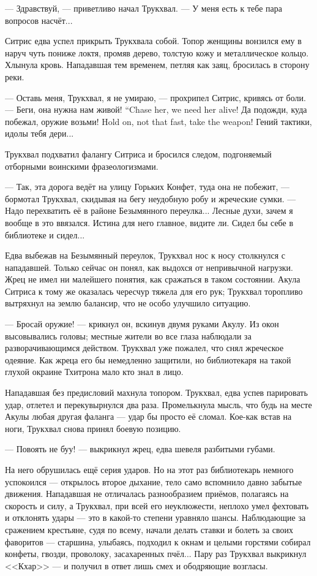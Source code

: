 --- Здравствуй, --- приветливо начал Трукхвал.
--- У меня есть к тебе пара вопросов насчёт...

Ситрис едва успел прикрыть Трукхвала собой.
Топор женщины вонзился ему в наруч чуть пониже локтя, промяв дерево, толстую кожу и металлическое кольцо.
Хлынула кровь.
Нападавшая тем временем, петляя как заяц, бросилась в сторону реки.

--- Оставь меня, Трукхвал, я не умираю, --- прохрипел Ситрис, кривясь от боли.
{--- Беги, она нужна нам живой!}
{``Chase her, we need her alive!}
{Да подожди, куда побежал, оружие возьми!}
{Hold on, not that fast, take the weapon!}
Гений тактики, идолы тебя дери...

Трукхвал подхватил фалангу Ситриса и бросился следом, подгоняемый отборными воинскими фразеологизмами.

--- Так, эта дорога ведёт на улицу Горьких Конфет, туда она не побежит, --- бормотал Трукхвал, скидывая на бегу неудобную робу и жреческие сумки.
--- Надо перехватить её в районе Безымянного переулка...
Лесные духи, зачем я вообще в это ввязался.
Истина для него главное, видите ли.
Сидел бы себе в библиотеке и сидел...

Едва выбежав на Безымянный переулок, Трукхвал нос к носу столкнулся с нападавшей.
Только сейчас он понял, как выдохся от непривычной нагрузки.
Жрец не имел ни малейшего понятия, как сражаться в таком состоянии.
Акула Ситриса к тому же оказалась чересчур тяжела для его рук;
Трукхвал торопливо вытряхнул на землю балансир, что не особо улучшило ситуацию.

--- Бросай оружие! --- крикнул он, вскинув двумя руками Акулу.
Из окон высовывались головы;
местные жители во все глаза наблюдали за разворачивающимся действом.
Трукхвал уже пожалел, что снял жреческое одеяние.
Как жреца его бы немедленно защитили, но библиотекаря на такой глухой окраине Тхитрона мало кто знал в лицо.

Нападавшая без предисловий махнула топором.
Трукхвал, едва успев парировать удар, отлетел и перекувырнулся два раза.
Промелькнула мысль, что будь на месте Акулы любая другая фаланга --- удар бы просто её сломал.
Кое-как встав на ноги, Трукхвал снова принял боевую позицию.

--- Повоять не буу! --- выкрикнул жрец, едва шевеля разбитыми губами.

На него обрушилась ещё серия ударов.
Но на этот раз библиотекарь немного успокоился --- открылось второе дыхание, тело само вспомнило давно забытые движения.
Нападавшая не отличалась разнообразием приёмов, полагаясь на скорость и силу, а Трукхвал, при всей его неуклюжести, неплохо умел фехтовать и отклонять удары --- это в какой-то степени уравняло шансы.
Наблюдающие за сражением крестьяне, судя по всему, начали делать ставки и болеть за своих фаворитов --- старшина, улыбаясь, подходил к окнам и целыми горстями собирал конфеты, гвозди, проволоку, засахаренных пчёл...
Пару раз Трукхвал выкрикнул <<Кхар>> --- и получил в ответ лишь смех и ободряющие возгласы.

